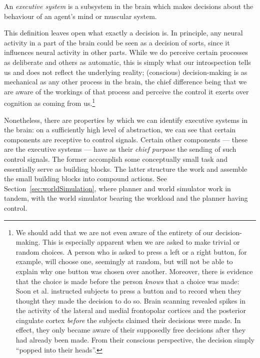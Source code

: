 \begin{definition}
An \emph{executive system} is a subsystem in the brain which makes decisions about the behaviour of an agent's mind or muscular system.
\end{definition}
\vspace{-2mm}
This definition leaves open what exactly a decision is. In principle, any neural activity in a part of the brain could be seen as a decision of sorts, since it influences neural activity in other parts. While we do perceive certain processes as deliberate and others as automatic, this is simply what our introspection tells us and does not reflect the underlying reality; (conscious) decision-making is as mechanical as any other process in the brain, the chief difference being that we are aware of the workings of that process and perceive the control it exerts over cognition as coming from us.\footnote{We should add that we are not even aware of the entirety of our decision-making. This is especially apparent when we are asked to make trivial or random choices. A person who is asked to press a left or a right button, for example, will choose one, seemingly at random, but will not be able to explain why one button was chosen over another. Moreover, there is evidence that the choice is made before the person {\em knows} that a choice was made: Soon et al. \cite{soon2008} instructed subjects to press a button and to record when they thought they made the decision to do so. Brain scanning revealed spikes in the activity of the lateral and medial frontopolar cortices and the posterior cingulate cortex {\em before} the subjects claimed their decisions were made. In effect, they only became aware of their supposedly free decisions after they had already been made. From their conscious perspective, the decision simply ``popped into their heads''.}

Nonetheless, there are properties by which we can identify executive systems in the brain: on a sufficiently high level of abstraction, we can see that certain components are receptive to control signals. Certain other components --- these are the executive systems --- have as their {\em chief purpose} the sending of such control signals. The former accomplish some conceptually small task and essentially serve as building blocks. The latter structure the work and assemble the small building blocks into compound actions. See Section~\ref{sec:worldSimulation}, where planner and world simulator work in tandem, with the world simulator bearing the workload and the planner having control.

